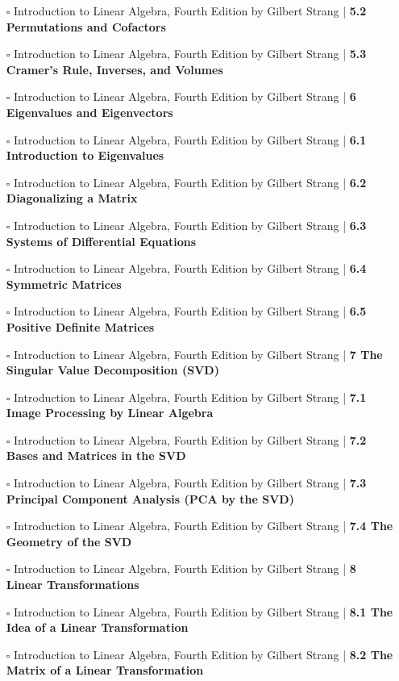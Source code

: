 \documentclass[a4, landscape, 12pt]{article}
\newcommand{\checkbox}{$\square$}%
\begin{document}
\begin{itemize}
{}
\item [\checkbox] Introduction to Linear Algebra, Fourth Edition by Gilbert Strang  | \textbf{5.2 Permutations and Cofactors
}
\item [\checkbox] Introduction to Linear Algebra, Fourth Edition by Gilbert Strang  | \textbf{5.3 Cramer’s Rule, Inverses, and Volumes
}
\item [\checkbox] Introduction to Linear Algebra, Fourth Edition by Gilbert Strang  | \textbf{6 Eigenvalues and Eigenvectors
}
\item [\checkbox] Introduction to Linear Algebra, Fourth Edition by Gilbert Strang  | \textbf{6.1 Introduction to Eigenvalues
}
\item [\checkbox] Introduction to Linear Algebra, Fourth Edition by Gilbert Strang  | \textbf{6.2 Diagonalizing a Matrix
}
\item [\checkbox] Introduction to Linear Algebra, Fourth Edition by Gilbert Strang  | \textbf{6.3 Systems of Differential Equations
}
\item [\checkbox] Introduction to Linear Algebra, Fourth Edition by Gilbert Strang  | \textbf{6.4 Symmetric Matrices
}
\item [\checkbox] Introduction to Linear Algebra, Fourth Edition by Gilbert Strang  | \textbf{6.5 Positive Definite Matrices
}
\item [\checkbox] Introduction to Linear Algebra, Fourth Edition by Gilbert Strang  | \textbf{7 The Singular Value Decomposition (SVD)
}
\item [\checkbox] Introduction to Linear Algebra, Fourth Edition by Gilbert Strang  | \textbf{7.1 Image Processing by Linear Algebra
}
\item [\checkbox] Introduction to Linear Algebra, Fourth Edition by Gilbert Strang  | \textbf{7.2 Bases and Matrices in the SVD
}
\item [\checkbox] Introduction to Linear Algebra, Fourth Edition by Gilbert Strang  | \textbf{7.3 Principal Component Analysis (PCA by the SVD)
}
\item [\checkbox] Introduction to Linear Algebra, Fourth Edition by Gilbert Strang  | \textbf{7.4 The Geometry of the SVD
}
\item [\checkbox] Introduction to Linear Algebra, Fourth Edition by Gilbert Strang  | \textbf{8 Linear Transformations
}
\item [\checkbox] Introduction to Linear Algebra, Fourth Edition by Gilbert Strang  | \textbf{8.1 The Idea of a Linear Transformation
}
\item [\checkbox] Introduction to Linear Algebra, Fourth Edition by Gilbert Strang  | \textbf{8.2 The Matrix of a Linear Transformation
}
\end{itemize}
\end{document}
